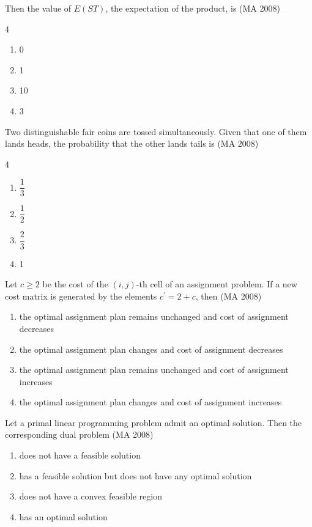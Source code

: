 Then the value of \(E(ST)\), the expectation of the product, is
\hfill (MA 2008)
\begin{multicols}{4}
\begin{enumerate}
\item 0
\item 1
\item 10
\item 3
\end{enumerate}
\end{multicols}

\item Two distinguishable fair coins are tossed simultaneously. Given that one of them lands heads, the probability that the other lands tails is
\hfill (MA 2008)
\begin{multicols}{4}
\begin{enumerate}
\item \(\dfrac{1}{3}\)
\item \(\dfrac{1}{2}\)
\item \(\dfrac{2}{3}\)
\item 1
\end{enumerate}
\end{multicols}

\item Let \(c \geq 2\) be the cost of the \((i,j)\)-th cell of an assignment problem. If a new cost matrix is generated by the elements \(c^{\prime} = 2 + c\), then
\hfill (MA 2008)

\begin{enumerate}
\item the optimal assignment plan remains unchanged and cost of assignment decreases
\item the optimal assignment plan changes and cost of assignment decreases
\item the optimal assignment plan remains unchanged and cost of assignment increases
\item the optimal assignment plan changes and cost of assignment increases
\end{enumerate}


\item Let a primal linear programming problem admit an optimal solution. Then the corresponding dual problem
\hfill (MA 2008)

\begin{enumerate}
\item does not have a feasible solution
\item has a feasible solution but does not have any optimal solution
\item does not have a convex feasible region
\item has an optimal solution
\end{enumerate}


